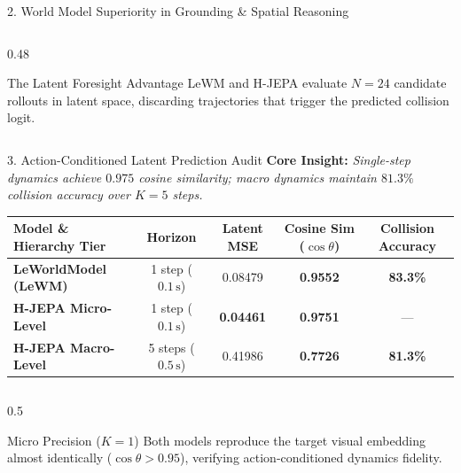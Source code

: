 \documentclass[aspectratio=169, 10pt]{beamer}
\begin{document}
\begin{frame}{2. World Model Superiority in Grounding \& Spatial Reasoning}
\begin{columns}[T]
    \begin{column}{0.48\textwidth}
      \begin{alertblock}{The Latent Foresight Advantage}
        \small
        LeWM and H-JEPA evaluate $N=24$ candidate rollouts in latent space, discarding trajectories that trigger the predicted collision logit.
      \end{alertblock}
    \end{column}
  \end{columns}
\end{frame}

\begin{frame}{3. Action-Conditioned Latent Prediction Audit}
  \textbf{Core Insight:} \textit{Single-step dynamics achieve $0.975$ cosine similarity; macro dynamics maintain $81.3\%$ collision accuracy over $K=5$ steps.}

  \vspace{0.2cm}
  \begin{table}[h]
    \centering
    \small
    \begin{tabular}{lcccc}
      \toprule
      \textbf{Model \& Hierarchy Tier} & \textbf{Horizon} & \textbf{Latent MSE} & \textbf{Cosine Sim ($\cos\theta$)} & \textbf{Collision Accuracy} \\
      \midrule
      \textbf{LeWorldModel (LeWM)} & 1 step ($0.1\,\text{s}$) & 0.08479 & \textbf{0.9552} & \textbf{83.3\%} \\
      \textbf{H-JEPA Micro-Level} & 1 step ($0.1\,\text{s}$) & \textbf{0.04461} & \textbf{0.9751} & --- \\
      \textbf{H-JEPA Macro-Level} & 5 steps ($0.5\,\text{s}$) & 0.41986 & \textbf{0.7726} & \textbf{81.3\%} \\
      \bottomrule
    \end{tabular}
  \end{table}

  \vspace{0.2cm}
  \begin{columns}[T]
    \begin{column}{0.5\textwidth}
      \begin{block}{Micro Precision ($K=1$)}
        \small
        Both models reproduce the target visual embedding almost identically ($\cos\theta > 0.95$), verifying action-conditioned dynamics fidelity.
      \end{block}
    \end{column}


\end{columns}
\end{frame}
\end{document}
